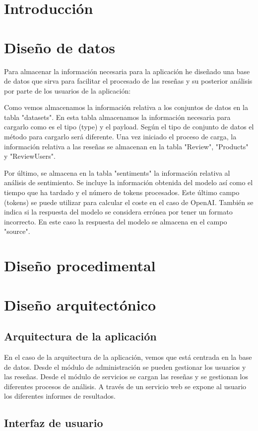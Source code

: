 
\section{Introducción}

\section{Diseño de datos}
Para almacenar la información necesaria para la aplicación he diseñado una base de datos 
que sirva para facilitar el procesado de las reseñas y su posterior análisis 
por parte de los usuarios de la aplicación:


Como vemos almacenamos la información relativa a los conjuntos de datos en la tabla "datasets".
En esta tabla almacenamos la información necesaria para cargarlo como es el tipo (type) y el payload.
Según el tipo de conjunto de datos el método para cargarlo será diferente.
Una vez iniciado el proceso de carga, la información relativa a las reseñas se almacenan en la tabla "Review", "Products" y "ReviewUsers".

Por último, se almacena en la tabla "sentiments" la información relativa al análisis de sentimiento.
Se incluye la información obtenida del modelo así como el tiempo que ha tardado y el número de tokens procesados.
Este último campo (tokens) se puede utilizar para calcular el coste en el caso de OpenAI.
También se indica si la respuesta del modelo se considera errónea por tener un formato incorrecto. 
En este caso la respuesta del modelo se almacena en el campo "source".

\section{Diseño procedimental}

\section{Diseño arquitectónico}

\subsection{Arquitectura de la aplicación}

En el caso de la arquitectura de la aplicación, vemos que está centrada en la base de datos.
Desde el módulo de administración se pueden gestionar los usuarios y las reseñas.
Desde el módulo de servicios se cargan las reseñas y se gestionan los diferentes procesos de análisis.
A través de un servicio web se expone al usuario los diferentes informes de resultados.


\subsection{Interfaz de usuario}
